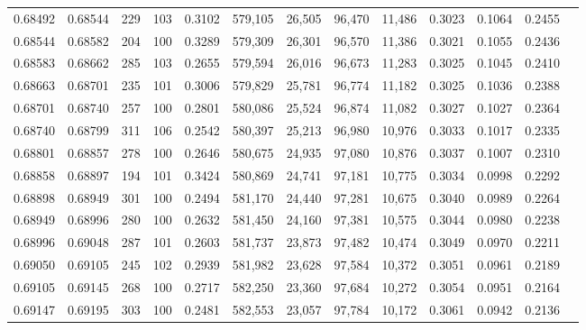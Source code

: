 \begin{tabular}{rrrrrrrrrrrrr}
0.68492 & 0.68544 &   229 & 103 &                                     0.3102 & 579,105 &  26,505 &  96,470 &  11,486 & 0.3023 & 0.1064 & 0.2455 \\
0.68544 & 0.68582 &   204 & 100 &                                     0.3289 & 579,309 &  26,301 &  96,570 &  11,386 & 0.3021 & 0.1055 & 0.2436 \\
0.68583 & 0.68662 &   285 & 103 &                                     0.2655 & 579,594 &  26,016 &  96,673 &  11,283 & 0.3025 & 0.1045 & 0.2410 \\
0.68663 & 0.68701 &   235 & 101 &                                     0.3006 & 579,829 &  25,781 &  96,774 &  11,182 & 0.3025 & 0.1036 & 0.2388 \\
0.68701 & 0.68740 &   257 & 100 &                                     0.2801 & 580,086 &  25,524 &  96,874 &  11,082 & 0.3027 & 0.1027 & 0.2364 \\
0.68740 & 0.68799 &   311 & 106 &                                     0.2542 & 580,397 &  25,213 &  96,980 &  10,976 & 0.3033 & 0.1017 & 0.2335 \\
0.68801 & 0.68857 &   278 & 100 &                                     0.2646 & 580,675 &  24,935 &  97,080 &  10,876 & 0.3037 & 0.1007 & 0.2310 \\
0.68858 & 0.68897 &   194 & 101 &                                     0.3424 & 580,869 &  24,741 &  97,181 &  10,775 & 0.3034 & 0.0998 & 0.2292 \\
0.68898 & 0.68949 &   301 & 100 &                                     0.2494 & 581,170 &  24,440 &  97,281 &  10,675 & 0.3040 & 0.0989 & 0.2264 \\
0.68949 & 0.68996 &   280 & 100 &                                     0.2632 & 581,450 &  24,160 &  97,381 &  10,575 & 0.3044 & 0.0980 & 0.2238 \\
0.68996 & 0.69048 &   287 & 101 &                                     0.2603 & 581,737 &  23,873 &  97,482 &  10,474 & 0.3049 & 0.0970 & 0.2211 \\
0.69050 & 0.69105 &   245 & 102 &                                     0.2939 & 581,982 &  23,628 &  97,584 &  10,372 & 0.3051 & 0.0961 & 0.2189 \\
0.69105 & 0.69145 &   268 & 100 &                                     0.2717 & 582,250 &  23,360 &  97,684 &  10,272 & 0.3054 & 0.0951 & 0.2164 \\
0.69147 & 0.69195 &   303 & 100 &                                     0.2481 & 582,553 &  23,057 &  97,784 &  10,172 & 0.3061 & 0.0942 & 0.2136 \\

\end{tabular}
